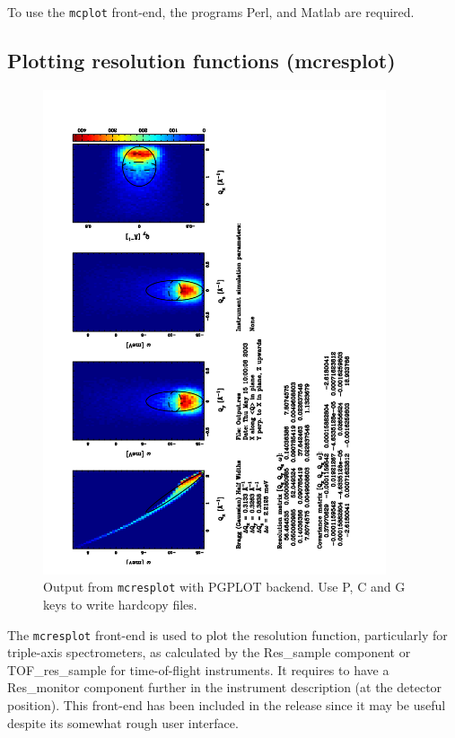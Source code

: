 To use the \verb+mcplot+ front-end, the programs Perl, and
Matlab are required. 


\subsection{Plotting resolution functions (mcresplot)}
\label{s:mcresplot}

\begin{figure}[htb!]
  \begin{center}
    \includegraphics[angle=-90,width=0.9\textwidth]{figures/mcresplot_PGPLOT}
  \end{center}
\caption{Output from \texttt{mcresplot} with PGPLOT backend.
  Use P, C and G keys to write hardcopy files.}
\label{fig:mcresplot_PGPLOT}
\end{figure}

The \verb+mcresplot+ front-end is used to plot the resolution function,
particularly for triple-axis
spectrometers, as calculated by the Res\_sample component or TOF\_res\_sample
for time-of-flight instruments. It requires to have a Res\_monitor component
further in the instrument description (at the detector position).
This front-end
has been included in the release since it may be useful
despite its somewhat rough user interface.


